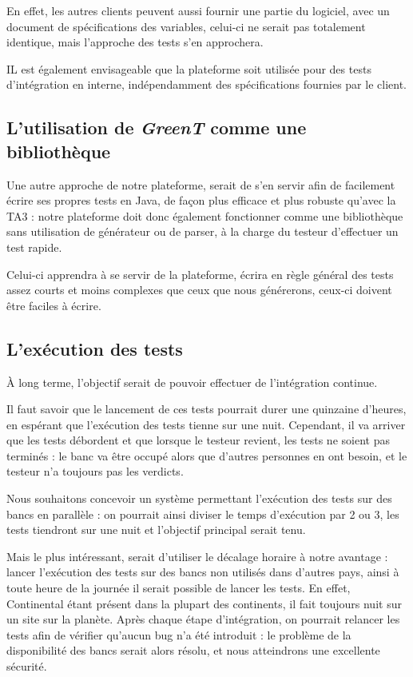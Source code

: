 	En effet, les autres clients peuvent aussi fournir une partie du logiciel, avec un document de spécifications des variables, celui-ci ne serait pas totalement identique, mais l'approche des tests s'en approchera.

	IL est également envisageable que la plateforme soit utilisée pour des tests d'intégration en interne, indépendamment des spécifications fournies par le client.

	\subsection{L'utilisation de \textit{GreenT} comme une bibliothèque}
		Une autre approche de notre plateforme, serait de s'en servir afin de facilement écrire ses propres tests en Java, de façon plus efficace et plus robuste qu'avec la TA3 : notre plateforme doit donc également fonctionner comme une bibliothèque sans utilisation de générateur ou de parser, à la charge du testeur d'effectuer un test rapide. 

		Celui-ci apprendra à se servir de la plateforme, écrira en règle général des tests assez courts et moins complexes que ceux que nous générerons, ceux-ci doivent être faciles à écrire.

	\subsection{L'exécution des tests}
	À long terme, l'objectif serait de pouvoir effectuer de l'intégration continue. 

	Il faut savoir que le lancement de ces tests pourrait durer une quinzaine d'heures, en espérant que l'exécution des tests tienne sur une nuit. Cependant, il va arriver que les tests débordent et que lorsque le testeur revient, les tests ne soient pas terminés : le banc va être occupé alors que d'autres personnes en ont besoin, et le testeur n'a toujours pas les verdicts.

	 Nous souhaitons concevoir un système permettant l'exécution des tests sur des bancs en parallèle : on pourrait ainsi diviser le temps d'exécution par 2 ou 3, les tests tiendront sur une nuit et l'objectif principal serait tenu.

	 Mais le plus intéressant, serait d'utiliser le décalage horaire à notre avantage : lancer l'exécution des tests sur des bancs non utilisés dans d'autres pays, ainsi à toute heure de la journée il serait possible de lancer les tests. En effet, Continental étant présent dans la plupart des continents, il fait toujours nuit sur un site sur la planète. Après chaque étape d'intégration, on pourrait relancer les tests afin de vérifier qu'aucun bug n'a été introduit : le problème de la disponibilité des bancs serait alors résolu, et nous atteindrons une excellente sécurité.

